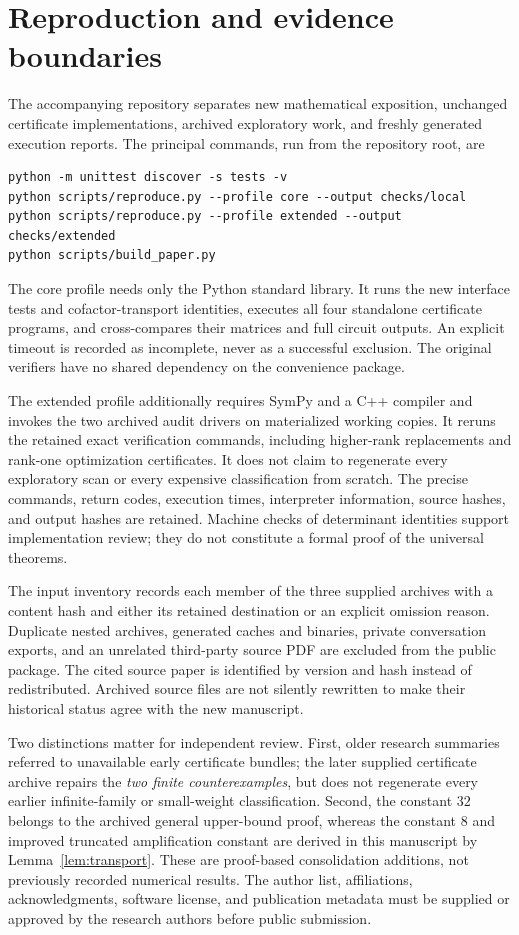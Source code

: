 \section{Reproduction and evidence boundaries}
\label{app:reproduction}
The accompanying repository separates new mathematical exposition, unchanged certificate implementations, archived exploratory work, and freshly generated execution reports. The principal commands, run from the repository root, are
\begin{Verbatim}[fontsize=\small]
python -m unittest discover -s tests -v
python scripts/reproduce.py --profile core --output checks/local
python scripts/reproduce.py --profile extended --output checks/extended
python scripts/build_paper.py
\end{Verbatim}
The core profile needs only the Python standard library. It runs the new interface tests and cofactor-transport identities, executes all four standalone certificate programs, and cross-compares their matrices and full circuit outputs. An explicit timeout is recorded as incomplete, never as a successful exclusion. The original verifiers have no shared dependency on the convenience package.

The extended profile additionally requires SymPy and a C++ compiler and invokes the two archived audit drivers on materialized working copies. It reruns the retained exact verification commands, including higher-rank replacements and rank-one optimization certificates. It does not claim to regenerate every exploratory scan or every expensive classification from scratch. The precise commands, return codes, execution times, interpreter information, source hashes, and output hashes are retained. Machine checks of determinant identities support implementation review; they do not constitute a formal proof of the universal theorems.

The input inventory records each member of the three supplied archives with a content hash and either its retained destination or an explicit omission reason. Duplicate nested archives, generated caches and binaries, private conversation exports, and an unrelated third-party source PDF are excluded from the public package. The cited source paper is identified by version and hash instead of redistributed. Archived source files are not silently rewritten to make their historical status agree with the new manuscript.

Two distinctions matter for independent review. First, older research summaries referred to unavailable early certificate bundles; the later supplied certificate archive repairs the \emph{two finite counterexamples}, but does not regenerate every earlier infinite-family or small-weight classification. Second, the constant $32$ belongs to the archived general upper-bound proof, whereas the constant $8$ and improved truncated amplification constant are derived in this manuscript by Lemma~\ref{lem:transport}. These are proof-based consolidation additions, not previously recorded numerical results. The author list, affiliations, acknowledgments, software license, and publication metadata must be supplied or approved by the research authors before public submission.

